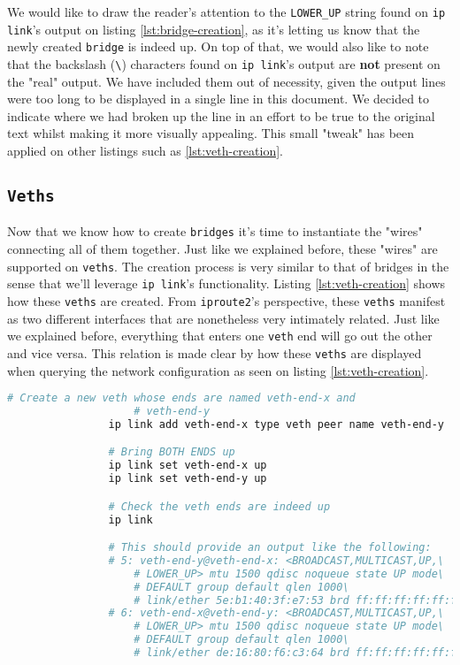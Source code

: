             We would like to draw the reader's attention to the \texttt{LOWER\_UP} string found on \texttt{ip link}'s output on listing \ref{lst:bridge-creation}, as it's letting us know that the newly created \texttt{bridge} is indeed up. On top of that, we would also like to note that the backslash (\texttt{\textbackslash}) characters found on \texttt{ip link}'s output are \textbf{not} present on the "real" output. We have included them out of necessity, given the output lines were too long to be displayed in a single line in this document. We decided to indicate where we had broken up the line in an effort to be true to the original text whilst making it more visually appealing. This small "tweak" has been applied on other listings such as \ref{lst:veth-creation}.

        \subsection{\texttt{Veths}}
            Now that we know how to create \texttt{bridges} it's time to instantiate the "wires" connecting all of them together. Just like we explained before, these "wires" are supported on \texttt{veths}. The creation process is very similar to that of bridges in the sense that we'll leverage \texttt{ip link}'s functionality. Listing \ref{lst:veth-creation} shows how these \texttt{veths} are created. From \texttt{iproute2}'s perspective, these \texttt{veths} manifest as two different interfaces that are nonetheless very intimately related. Just like we explained before, everything that enters one \texttt{veth} end will go out the other and vice versa. This relation is made clear by how these \texttt{veths} are displayed when querying the network configuration as seen on listing \ref{lst:veth-creation}.

            \begin{lstlisting}[language = bash, caption = Instantiating a Virtual Ethernet Interface., label = lst:veth-creation]
                # Create a new veth whose ends are named veth-end-x and
                    # veth-end-y
                ip link add veth-end-x type veth peer name veth-end-y

                # Bring BOTH ENDS up
                ip link set veth-end-x up
                ip link set veth-end-y up

                # Check the veth ends are indeed up
                ip link

                # This should provide an output like the following:
                # 5: veth-end-y@veth-end-x: <BROADCAST,MULTICAST,UP,\
                    # LOWER_UP> mtu 1500 qdisc noqueue state UP mode\
                    # DEFAULT group default qlen 1000\
                    # link/ether 5e:b1:40:3f:e7:53 brd ff:ff:ff:ff:ff:ff
                # 6: veth-end-x@veth-end-y: <BROADCAST,MULTICAST,UP,\
                    # LOWER_UP> mtu 1500 qdisc noqueue state UP mode\
                    # DEFAULT group default qlen 1000\
                    # link/ether de:16:80:f6:c3:64 brd ff:ff:ff:ff:ff:ff
            \end{lstlisting}

